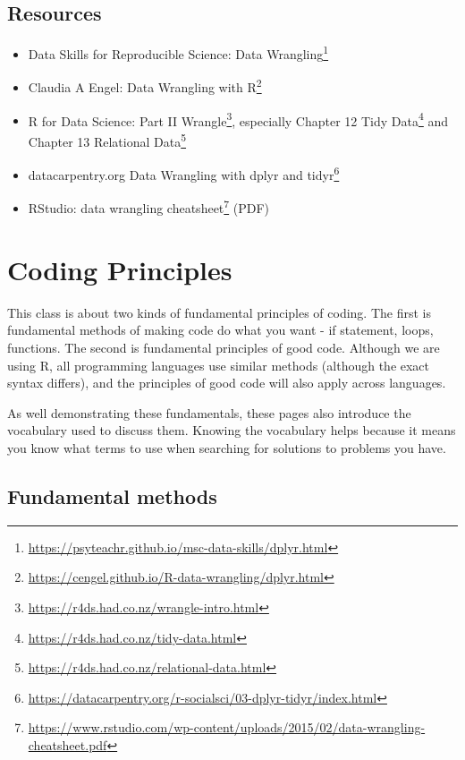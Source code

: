 \documentclass[
  12pt,
  a5paper,
]{book}
\DeclareRobustCommand{\href}[2]{#2\footnote{\url{#1}}}
\providecommand{\tightlist}{%
  \setlength{\itemsep}{0pt}\setlength{\parskip}{0pt}}
\begin{document}
\hypertarget{resources-4}{%
\section{Resources}\label{resources-4}}

\begin{itemize}
\tightlist
\item
  Data Skills for Reproducible Science: \href{https://psyteachr.github.io/msc-data-skills/dplyr.html}{Data Wrangling}
\item
  Claudia A Engel: \href{https://cengel.github.io/R-data-wrangling/dplyr.html}{Data Wrangling with R}
\item
  R for Data Science: Part II \href{https://r4ds.had.co.nz/wrangle-intro.html}{Wrangle}, especially \href{https://r4ds.had.co.nz/tidy-data.html}{Chapter 12 Tidy Data} and \href{https://r4ds.had.co.nz/relational-data.html}{Chapter 13 Relational Data}
\item
  datacarpentry.org \href{https://datacarpentry.org/r-socialsci/03-dplyr-tidyr/index.html}{Data Wrangling with dplyr and tidyr}
\item
  RStudio: \href{https://www.rstudio.com/wp-content/uploads/2015/02/data-wrangling-cheatsheet.pdf}{data wrangling cheatsheet} (PDF)
\end{itemize}

\hypertarget{coding-principles}{%
\chapter{Coding Principles}\label{coding-principles}}

This class is about two kinds of fundamental principles of coding. The first is fundamental methods of making code do what you want - if statement, loops, functions. The second is fundamental principles of good code. Although we are using R, all programming languages use similar methods (although the exact syntax differs), and the principles of good code will also apply across languages.

As well demonstrating these fundamentals, these pages also introduce the vocabulary used to discuss them. Knowing the vocabulary helps because it means you know what terms to use when searching for solutions to problems you have.

\hypertarget{fundamental-methods}{%
\section{Fundamental methods}\label{fundamental-methods}}
\end{document}
